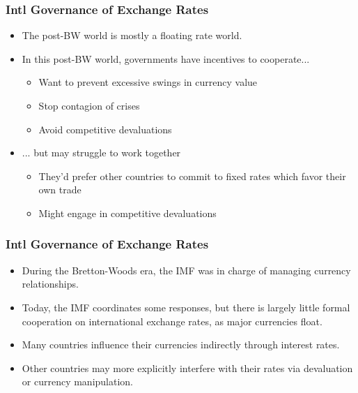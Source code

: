\documentclass[handout]{beamer}
\begin{document}
\begin{frame} 
	\frametitle{\LARGE{Intl Governance of Exchange Rates}}
	\begin{itemize}
			\item The post-BW world is mostly a floating rate world.
			\item In this post-BW world, governments have incentives to cooperate... \pause
			\begin{itemize}
				\item Want to prevent excessive swings in currency value \pause 
				\item Stop contagion of crises \pause 
				\item Avoid competitive devaluations  \pause
			\end{itemize}
			\item ... but may struggle to work together \pause
			\begin{itemize}
				\item They'd prefer other countries to commit to fixed rates which favor their own trade \pause 
				\item Might engage in competitive devaluations  
			\end{itemize}
		
	\end{itemize}
\end{frame}

\begin{frame} 
	\frametitle{\LARGE{Intl Governance of Exchange Rates}}
	\begin{itemize}
		\item During the Bretton-Woods era, the IMF was in charge of managing currency relationships. \pause
		\item Today, the IMF coordinates some responses, but there is largely little formal cooperation on international exchange rates, as  major currencies float. \pause 
		\item Many countries influence their currencies indirectly through interest rates. \pause 
		\item Other countries may more explicitly interfere with their rates via devaluation or currency manipulation.		
	\end{itemize}
\end{frame}
\end{document}
